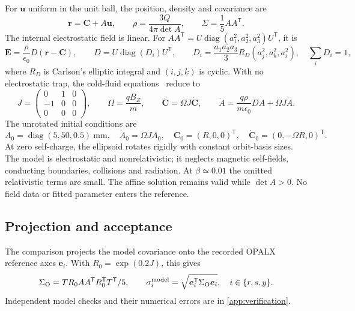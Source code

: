\documentclass[10pt,a4paper]{article}
\newcommand{\T}{\mathsf T}
\newcommand{\eps}{\epsilon_0}
\begin{document}
\clearpage
For $\bm u$ uniform in the unit ball, the position, density and covariance are
\begin{equation}
 \bm r=\bm C+A\bm u,\qquad
 \rho=\frac{3Q}{4\pi\det A},\qquad
 \Sigma=\frac15 AA^\T .\label{eq:affine}
\end{equation}
The internal electrostatic field is linear. For
$AA^\T=U\operatorname{diag}(a_1^2,a_2^2,a_3^2)U^\T$, it is
\begin{equation}
 \bm E=\frac{\rho}{\eps}D(\bm r-\bm C),\qquad
 D=U\operatorname{diag}(D_i)U^\T,\qquad
 D_i=\frac{a_1a_2a_3}{3}R_D(a_j^2,a_k^2,a_i^2),\quad \sum_iD_i=1,
 \label{eq:field}
\end{equation}
where $R_D$ is Carlson's elliptic integral and $(i,j,k)$ is cyclic.
With no electrostatic trap, the cold-fluid equations~\cite{dubin} reduce to
\begin{equation}
 J=\begin{pmatrix}0&1&0\\-1&0&0\\0&0&0\end{pmatrix},\qquad
 \Omega=\frac{qB_Z}{m},\qquad
 \ddot{\bm C}=\Omega J\dot{\bm C},\qquad
 \ddot A=\frac{q\rho}{m\eps}DA+\Omega J\dot A .\label{eq:model}
\end{equation}
The unrotated initial conditions are
\begin{equation}
 A_0=\operatorname{diag}(5,50,0.5)~\mathrm{mm},\quad
 \dot A_0=\Omega JA_0,\quad
 \bm C_0=(R,0,0)^\T,\quad
 \dot{\bm C}_0=(0,-\Omega R,0)^\T .
\end{equation}
At zero self-charge, the ellipsoid rotates rigidly with constant orbit-basis
sizes. The model is electrostatic and nonrelativistic; it neglects magnetic
self-fields, conducting boundaries, collisions and radiation. At $\beta\simeq
0.01$ the omitted relativistic terms are small. The affine solution remains
valid while $\det A>0$. No field data or fitted parameter enters the reference.

\subsection{Projection and acceptance}
The comparison projects the model covariance onto the recorded OPALX reference
axes $\bm e_i$. With $R_0=\exp(0.2J)$, this gives
\begin{equation}
 \Sigma_{\rm O}=T R_0AA^\T R_0^\T T^\T/5,\qquad
 \sigma_i^{\rm model}=\sqrt{\bm e_i^\T\Sigma_{\rm O}\bm e_i},\quad i\in\{r,s,y\}.
 \label{eq:projection}
\end{equation}
Independent model checks and their numerical errors are in
\cref{app:verification}.
\end{document}
